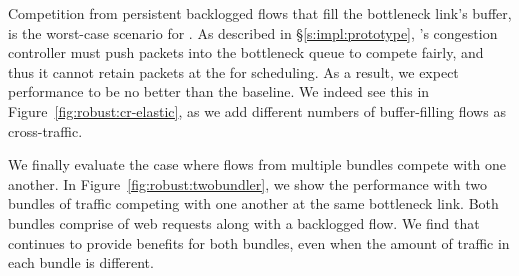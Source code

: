 
 Competition from persistent backlogged flows that fill the bottleneck link's buffer, is the worst-case scenario for \name.
As described in \S\ref{s:impl:prototype}, \name's congestion controller must push packets into the bottleneck queue to compete fairly, and thus it cannot retain packets at the \inbox for scheduling. As a result, we expect performance to be no better than the baseline. We indeed see this in Figure~\ref{fig:robust:cr-elastic}, as we add different numbers of buffer-filling flows as cross-traffic.



 We finally evaluate the case where flows from multiple bundles compete with one another. 
In Figure~\ref{fig:robust:twobundler}, we show the performance with two bundles of traffic competing with one another at the same bottleneck link. Both bundles comprise of web requests along with a backlogged flow. We find that \name continues to provide benefits for both bundles, even when the amount of traffic in each bundle is different.  

